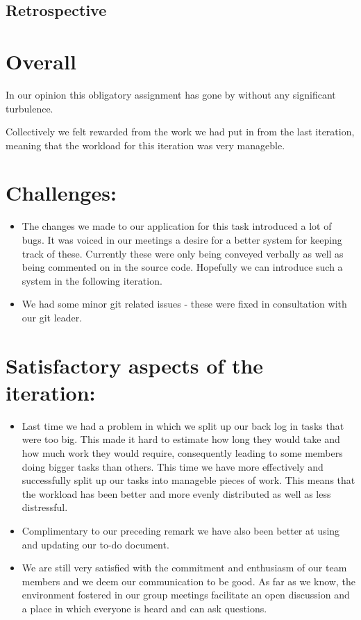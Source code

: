 \documentclass[a4paper, 11pt]{article}
\begin{document}
\noindent

\begin{center}
\section*{Retrospective}
\end{center}
\vspace{10 mm}
\section*{Overall}
In our opinion this obligatory assignment has gone by without any significant turbulence. 

\noindent
Collectively we felt rewarded from the work we had put in from the last iteration, meaning that the workload for this iteration was very manageble.


\section*{Challenges:}
\begin{itemize}
\item The changes we made to our application for this task introduced a lot of bugs. It was voiced in our meetings a desire for a better system for keeping track of these. Currently these were only being conveyed verbally as well as being commented on in the source code. Hopefully we can introduce such a system in the following iteration.
\item We had some minor git related issues - these were fixed in consultation with our git leader.
\end{itemize}


\noindent

\section*{Satisfactory aspects of the iteration:}
\begin{itemize}
\item Last time we had a problem in which we split up our back log in tasks that were too big. This made it hard to estimate how long they would take and how much work they would require, consequently leading to some members doing bigger tasks than others. This time we have more effectively and successfully split up our tasks into manageble pieces of work. This means that the workload has been better and more evenly distributed as well as less distressful.
\item Complimentary to our preceding remark we have also been better at using and updating our to-do document. 
\item We are still very satisfied with the commitment and enthusiasm of our team members and we deem our communication to be good. As far as we know, the environment fostered in our group meetings facilitate an open discussion and a place in which everyone is heard and can ask questions.  
\end{itemize}
\noindent
\end{document}
